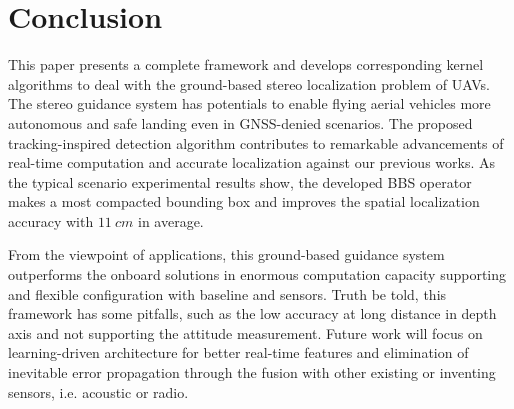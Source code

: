 



\section{Conclusion}
This paper presents a complete framework and develops corresponding kernel algorithms to deal with the ground-based stereo localization problem of UAVs. The stereo guidance system has potentials to enable flying aerial vehicles more autonomous and safe landing even in GNSS-denied scenarios. The proposed tracking-inspired detection algorithm contributes to remarkable advancements of real-time computation and accurate localization against our previous works. As the typical scenario experimental results show, the developed BBS operator makes a most compacted bounding box and improves the spatial localization accuracy with $11\ cm$ in average. 

From the viewpoint of applications, this ground-based guidance system outperforms the onboard solutions in enormous computation capacity supporting and flexible configuration with baseline and sensors. Truth be told, this framework has some pitfalls, such as the low accuracy at long distance in depth axis and not supporting the attitude measurement. Future work will focus on learning-driven architecture for better real-time features and elimination of inevitable error propagation through the fusion with other existing or inventing sensors, i.e. acoustic or radio.


